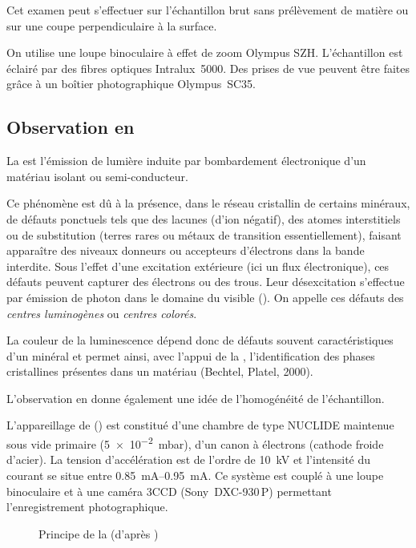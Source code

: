 Cet examen peut s'effectuer sur l'échantillon brut sans prélèvement 
de matière ou sur une coupe perpendiculaire à la surface.

On utilise une loupe binoculaire à effet de zoom Olympus SZH. 
L'échantillon est éclairé par des fibres optiques Intralux~5000. 
Des prises de vue peuvent être faites grâce à un boîtier 
photographique Olympus~SC35.

\subsection{Observation en \CL}
La \CL est l'émission de lumière induite par bombardement électronique 
d'un matériau isolant ou semi-conducteur.

Ce phénomène est dû à la présence, dans le réseau cristallin de 
certains minéraux, de défauts ponctuels tels que des lacunes (d'ion 
négatif), des atomes interstitiels ou de substitution (terres rares 
ou métaux de transition essentiellement), faisant apparaître des 
niveaux donneurs ou accepteurs d'électrons dans la bande interdite. 
Sous l'effet d'une excitation extérieure (ici un flux électronique), 
ces défauts peuvent capturer des électrons ou des trous. Leur 
désexcitation s'effectue par émission de photon dans le domaine 
du visible (). On appelle ces défauts des 
\emph{centres luminogènes} ou \emph{centres colorés}.

La couleur de la luminescence dépend donc de défauts souvent 
caractéristiques d'un minéral et permet ainsi, avec l'appui de 
la \DX, l'identification des phases cristallines présentes dans 
un matériau (Bechtel, Platel, 2000).

L'observation en \CL donne également une idée de l'homogénéité de 
l'échantillon.

L'appareillage de \CL () est constitué d'une chambre 
de type NUCLIDE maintenue sous vide primaire (\SI{5e-2}{\milli\bar}), 
d'un canon à électrons (cathode froide d'acier). La tension 
d'accélération est de l'ordre de \SI{10}{\kV} et l'intensité du 
courant se situe entre \SIrange[range-phrase=\ et\ ]{0.85}{0.95}{\mA}. 
Ce système est couplé à une loupe binoculaire et à une caméra 3CCD 
(Sony~DXC-930\,P) permettant l'enregistrement photographique.

\begin{figure}[htb]
  \caption[Principe de la \CL]
          {Principe de la \CL (d'après \cite{web_CL})}
  \label{fig:CL_principe}
\end{figure}


